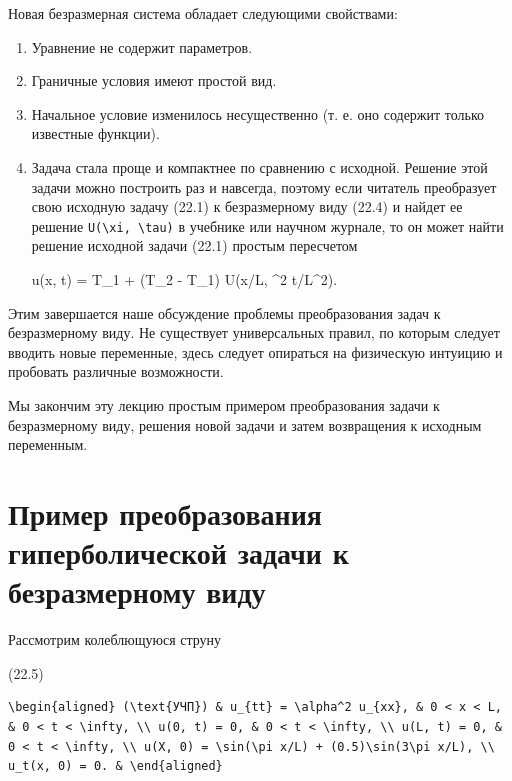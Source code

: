 \documentclass[
  ukrainian,
]{article}
\begin{document}
Новая безразмерная система обладает следующими свойствами:

\begin{enumerate}
\def\labelenumi{\arabic{enumi}.}
\item
  Уравнение не содержит параметров.
\item
  Граничные условия имеют простой вид.
\item
  Начальное условие изменилось несущественно (т. е. оно содержит только
  известные функции).
\item
  Задача стала проще и компактнее по сравнению с исходной. Решение этой
  задачи можно построить раз и навсегда, поэтому если читатель
  преобразует свою исходную задачу (22.1) к безразмерному виду (22.4) и
  найдет ее решение \texttt{U(\textbackslash{}xi,\ \textbackslash{}tau)}
  в учебнике или научном журнале, то он может найти решение исходной
  задачи (22.1) простым пересчетом

  u(x, t) = T\_1 + (T\_2 - T\_1) U(x/L, \alpha\^{}2 t/L\^{}2).
\end{enumerate}

Этим завершается наше обсуждение проблемы преобразования задач к
безразмерному виду. Не существует универсальных правил, по которым
следует вводить новые переменные, здесь следует опираться на физическую
интуицию и пробовать различные возможности.

Мы закончим эту лекцию простым примером преобразования задачи к
безразмерному виду, решения новой задачи и затем возвращения к исходным
переменным.

\section{Пример преобразования гиперболической задачи к безразмерному
виду}\label{ux43fux440ux438ux43cux435ux440-ux43fux440ux435ux43eux431ux440ux430ux437ux43eux432ux430ux43dux438ux44f-ux433ux438ux43fux435ux440ux431ux43eux43bux438ux447ux435ux441ux43aux43eux439-ux437ux430ux434ux430ux447ux438-ux43a-ux431ux435ux437ux440ux430ux437ux43cux435ux440ux43dux43eux43cux443-ux432ux438ux434ux443}

Рассмотрим колеблющуюся струну

(22.5)

\begin{verbatim}
\begin{aligned} (\text{УЧП}) & u_{tt} = \alpha^2 u_{xx}, & 0 < x < L, & 0 < t < \infty, \\ u(0, t) = 0, & 0 < t < \infty, \\ u(L, t) = 0, & 0 < t < \infty, \\ u(X, 0) = \sin(\pi x/L) + (0.5)\sin(3\pi x/L), \\ u_t(x, 0) = 0. & \end{aligned}
\end{verbatim}
\end{document}
